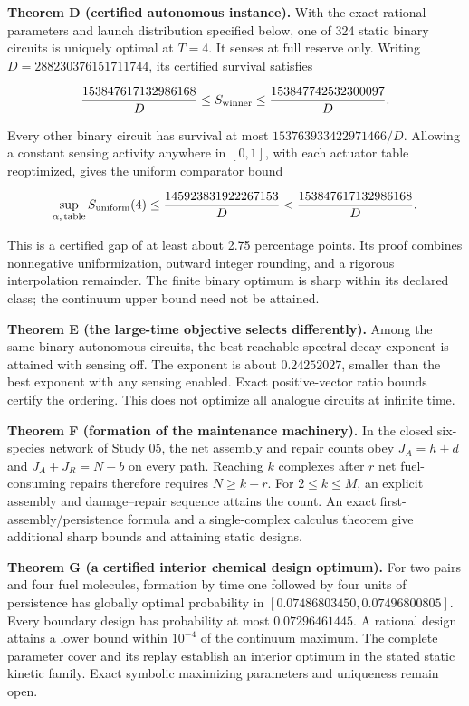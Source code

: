 \documentclass[
  11pt,
]{article}
\begin{document}
\textbf{Theorem D (certified autonomous instance).} With the exact
rational parameters and launch distribution specified below, one of 324
static binary circuits is uniquely optimal at \(T=4\). It senses at full
reserve only. Writing \(D=288230376151711744\), its certified survival
satisfies

\[
\frac{153847617132986168}{D}\le S_{\rm winner}\le
\frac{153847742532300097}{D}.
\]

Every other binary circuit has survival at most
\(153763933422971466/D\). Allowing a constant sensing activity anywhere
in \([0,1]\), with each actuator table reoptimized, gives the uniform
comparator bound

\[
\sup_{\alpha,\,\mathrm{table}}S_{\rm uniform}(4)
\le\frac{145923831922267153}{D}
<\frac{153847617132986168}{D}.
\]

This is a certified gap of at least about 2.75 percentage points. Its
proof combines nonnegative uniformization, outward integer rounding, and
a rigorous interpolation remainder. The finite binary optimum is sharp
within its declared class; the continuum upper bound need not be
attained.

\textbf{Theorem E (the large-time objective selects differently).} Among
the same binary autonomous circuits, the best reachable spectral decay
exponent is attained with sensing off. The exponent is about
\(0.24252027\), smaller than the best exponent with any sensing enabled.
Exact positive-vector ratio bounds certify the ordering. This does not
optimize all analogue circuits at infinite time.

\textbf{Theorem F (formation of the maintenance machinery).} In the
closed six-species network of Study 05, the net assembly and repair
counts obey \(J_A=h+d\) and \(J_A+J_R=N-b\) on every path. Reaching
\(k\) complexes after \(r\) net fuel-consuming repairs therefore
requires \(N\ge k+r\). For \(2\le k\le M\), an explicit assembly and
damage--repair sequence attains the count. An exact
first-assembly/persistence formula and a single-complex calculus theorem
give additional sharp bounds and attaining static designs.

\textbf{Theorem G (a certified interior chemical design optimum).} For
two pairs and four fuel molecules, formation by time one followed by
four units of persistence has globally optimal probability in
\([0.07486803450,0.07496800805]\). Every boundary design has probability
at most \(0.07296461445\). A rational design attains a lower bound
within \(10^{-4}\) of the continuum maximum. The complete parameter
cover and its replay establish an interior optimum in the stated static
kinetic family. Exact symbolic maximizing parameters and uniqueness
remain open.
\end{document}
